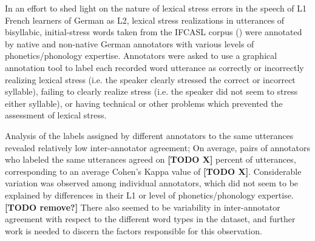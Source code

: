 \documentclass[11pt,a4paper,onecolumn]{article}
\newcommand{\TODO}[1]{{\color{red}\textbf{[TODO #1]}}}
\begin{document}
In an effort to shed light on the nature of lexical stress errors in the speech of L1 French learners of German as L2, 
	lexical stress realizations in utterances of bisyllabic, initial-stress words %
	taken from the IFCASL corpus (\cite{Trouvain2013,Fauth2014}) %
	were annotated by native and non-native German annotators with various levels of phonetics/phonology expertise.%
	Annotators were asked to use a graphical annotation tool to label each recorded word utterance
	as correctly or incorrectly realizing lexical stress (i.e. the speaker clearly stressed the correct or incorrect syllable), failing to clearly realize stress (i.e. the speaker did not seem to stress either syllable), or having technical or other problems which prevented the assessment of lexical stress. %
	
	Analysis of the labels assigned by different annotators to the same utterances %
	revealed relatively low inter-annotator agreement; %
	On average, pairs of annotators who labeled the same utterances agreed on \TODO{X} percent of utterances, corresponding to an average Cohen's Kappa \citep{Cohen1960} value of \TODO{X}.
	Considerable variation was observed among individual annotators, %
	which did not seem to be explained by differences 
	in their L1 %
	or level of phonetics/phonology expertise. %
\TODO{remove?} There also seemed to be variability in inter-annotator 
	agreement with respect to the different word types %
	in the dataset, and further work is needed to discern the factors responsible for this observation. %
	
\end{document}
